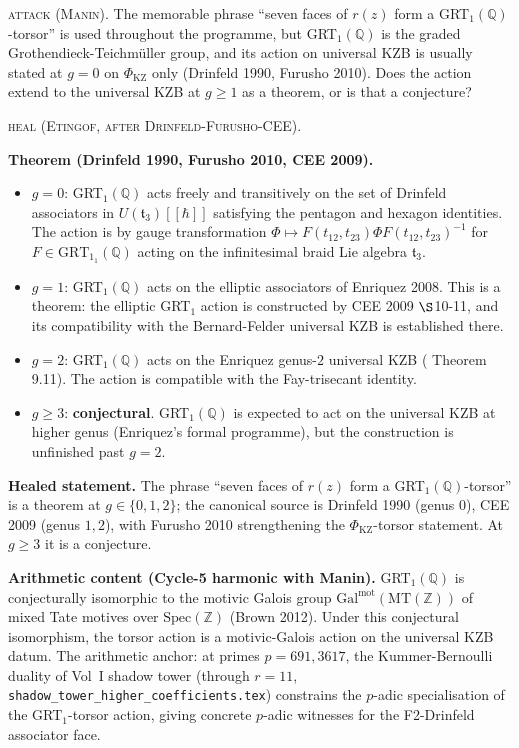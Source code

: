 \documentclass[12pt]{article}
\providecommand{\KZ}{\mathrm{KZ}}
\providecommand{\GRT}{\mathrm{GRT}_1}
\theoremstyle{definition}
\begin{document}
\textsc{attack (Manin).}
The memorable phrase ``seven faces of $r(z)$ form a
GRT$_1(\mathbb{Q})$-torsor'' is used throughout the programme,
but GRT$_1(\mathbb{Q})$ is the graded Grothendieck-Teichm\"uller
group, and its action on universal KZB is usually stated at
$g = 0$ on $\Phi_{\KZ}$ only (Drinfeld 1990, Furusho 2010).
Does the action extend to the universal KZB at $g \geq 1$
as a theorem, or is that a conjecture?

\textsc{heal (Etingof, after Drinfeld-Furusho-CEE).}

\textbf{Theorem (Drinfeld 1990, Furusho 2010, CEE 2009).}
\begin{itemize}
\item $g = 0$: GRT$_1(\mathbb{Q})$ acts freely and transitively
  on the set of Drinfeld associators in $U(\mathfrak{t}_3)[[\hbar]]$
  satisfying the pentagon and hexagon identities.  The action
  is by gauge transformation
  $\Phi \mapsto F(t_{12}, t_{23}) \Phi F(t_{12}, t_{23})^{-1}$
  for $F \in \GRT_1(\mathbb{Q})$ acting on the infinitesimal
  braid Lie algebra $\mathfrak{t}_3$.
\item $g = 1$: GRT$_1(\mathbb{Q})$ acts on the elliptic
  associators of Enriquez 2008.  This is a theorem:
  the elliptic GRT$_1$ action is constructed by CEE 2009
  $\S$10-11, and its compatibility with the Bernard-Felder
  universal KZB is established there.
\item $g = 2$: GRT$_1(\mathbb{Q})$ acts on the Enriquez
  genus-$2$ universal KZB (\cite{CEE09} Theorem 9.11).  The
  action is compatible with the Fay-trisecant identity.
\item $g \geq 3$: \textbf{conjectural}.  GRT$_1(\mathbb{Q})$
  is expected to act on the universal KZB at higher genus
  (Enriquez's formal programme), but the construction is
  unfinished past $g = 2$.
\end{itemize}

\textbf{Healed statement.}
The phrase ``seven faces of $r(z)$ form a
GRT$_1(\mathbb{Q})$-torsor'' is a theorem at $g \in \{0, 1, 2\}$;
the canonical source is Drinfeld 1990 (genus $0$), CEE 2009
(genus $1, 2$), with Furusho 2010 strengthening the
$\Phi_{\KZ}$-torsor statement.  At $g \geq 3$ it is a
conjecture.

\textbf{Arithmetic content (Cycle-5 harmonic with Manin).}
GRT$_1(\mathbb{Q})$ is conjecturally isomorphic to the motivic
Galois group $\mathrm{Gal}^{\mathrm{mot}}(\mathrm{MT}(\mathbb{Z}))$
of mixed Tate motives over $\mathrm{Spec}(\mathbb{Z})$
(Brown 2012).  Under this conjectural isomorphism, the torsor
action is a motivic-Galois action on the universal KZB datum.
The arithmetic anchor: at primes $p = 691, 3617$, the Kummer-Bernoulli
duality of Vol~I shadow tower (through $r = 11$,
\texttt{shadow\_tower\_higher\_coefficients.tex}) constrains the
$p$-adic specialisation of the GRT$_1$-torsor action, giving
concrete $p$-adic witnesses for the F2-Drinfeld associator face.
\end{document}
